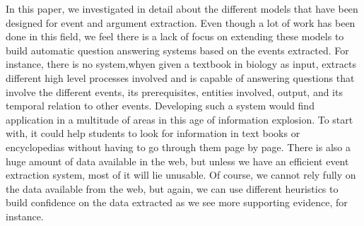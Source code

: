 In this paper, we investigated in detail about the different models that have been designed for event and argument extraction. Even though a lot of work has been done in this field, we feel there is a lack of focus on extending these models to build automatic question answering systems based on the events extracted. For instance, there is no system,whyen given a textbook in biology as input, extracts different high level processes involved and is capable of answering questions that involve the different events, its prerequisites, entities involved, output, and its temporal relation to other events. Developing such a system would find application in a multitude of areas in this age of information explosion. To start with, it could help students to look for information in text books or encyclopedias without having to go through them page by page. There is also a huge amount of data available in the web, but unless we have an efficient event extraction system, most of it will lie unusable. Of course, we cannot rely fully on the data available from the web, but again, we can use different heuristics to build confidence on the data extracted as we see more supporting evidence, for instance.